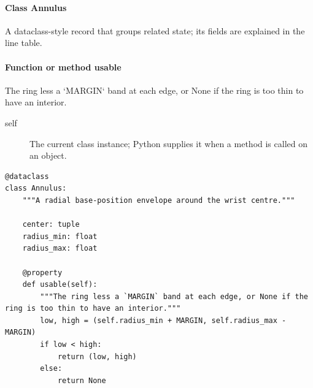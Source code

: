 \documentclass[11pt,a4paper]{book}
\begin{document}
\paragraph{Class Annulus}
A dataclass-style record that groups related state; its fields are explained in the line table.


\paragraph{Function or method usable}
The ring less a `MARGIN` band at each edge, or None if the ring is too thin to have an interior.

\begin{description}
\item[self] The current class instance; Python supplies it when a method is called on an object.
\end{description}

\begin{lstlisting}[firstnumber=48]
@dataclass
class Annulus:
    """A radial base-position envelope around the wrist centre."""

    center: tuple
    radius_min: float
    radius_max: float

    @property
    def usable(self):
        """The ring less a `MARGIN` band at each edge, or None if the ring is too thin to have an interior."""
        low, high = (self.radius_min + MARGIN, self.radius_max - MARGIN)
        if low < high:
            return (low, high)
        else:
            return None


\end{lstlisting}
\end{document}
